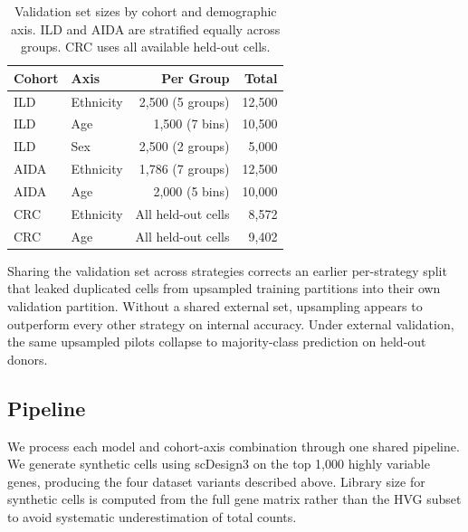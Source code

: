 \documentclass[sigconf]{acmart}
\begin{document}
\begin{table}[h]
\footnotesize
\centering
\caption{Validation set sizes by cohort and demographic axis. ILD and AIDA 
are stratified equally across groups. CRC uses all available held-out cells.}
\label{tab:val_sets}
\begin{tabular*}{\columnwidth}{@{\extracolsep{\fill}} llrr}
\toprule
\textbf{Cohort} & \textbf{Axis} & \textbf{Per Group} & \textbf{Total} \\
\midrule
ILD  & Ethnicity & 2{,}500 (5 groups)  & 12{,}500 \\
ILD  & Age       & 1{,}500 (7 bins)    & 10{,}500 \\
ILD  & Sex       & 2{,}500 (2 groups)  & 5{,}000  \\
\midrule
AIDA & Ethnicity & 1{,}786 (7 groups)  & 12{,}500 \\
AIDA & Age       & 2{,}000 (5 bins)    & 10{,}000 \\
\midrule
CRC  & Ethnicity & All held-out cells  & 8{,}572  \\
CRC  & Age       & All held-out cells  & 9{,}402  \\
\bottomrule
\end{tabular*}
\end{table}

Sharing the validation set across strategies corrects an earlier per-strategy 
split that leaked duplicated cells from upsampled training partitions into 
their own validation partition. Without a shared external set, upsampling 
appears to outperform every other strategy on internal accuracy. Under external 
validation, the same upsampled pilots collapse to majority-class prediction on 
held-out donors.

\subsection{Pipeline}
\label{sec:pipeline}

We process each model and cohort-axis combination through one shared pipeline. 
We generate synthetic cells using scDesign3 on the top 1{,}000 highly variable 
genes, producing the four dataset variants described above. Library size for synthetic cells is computed from the full 
gene matrix rather than the HVG subset to avoid systematic underestimation of 
total counts.
\end{document}

